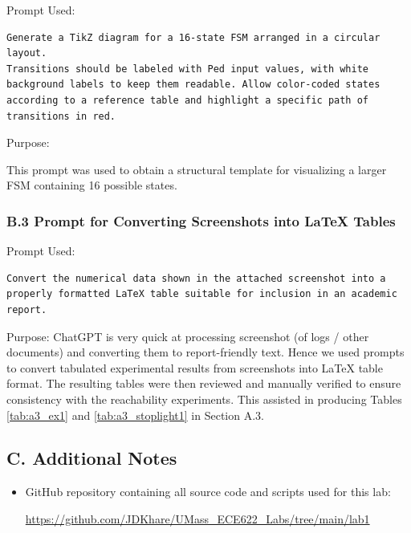 \documentclass[10pt]{article}
\begin{document}
Prompt Used:

\begin{verbatim}
Generate a TikZ diagram for a 16-state FSM arranged in a circular layout.
Transitions should be labeled with Ped input values, with white
background labels to keep them readable. Allow color-coded states
according to a reference table and highlight a specific path of
transitions in red.
\end{verbatim}

Purpose:

This prompt was used to obtain a structural template for visualizing a larger FSM containing 16 possible states.


\subsubsection*{B.3 Prompt for Converting Screenshots into LaTeX Tables}

Prompt Used:
\begin{verbatim}
Convert the numerical data shown in the attached screenshot into a
properly formatted LaTeX table suitable for inclusion in an academic report.
\end{verbatim}

Purpose:
ChatGPT is very quick at processing screenshot (of logs / other documents) and converting them to report-friendly text. Hence we used prompts to convert tabulated experimental results from screenshots into LaTeX table format. The resulting tables were then reviewed and manually verified to ensure consistency with the reachability experiments. This assisted in producing Tables \ref{tab:a3_ex1} and \ref{tab:a3_stoplight1} in Section A.3.

\subsection*{C. Additional Notes}

\begin{itemize}
\item GitHub repository containing all source code and scripts used for this lab:

\url{https://github.com/JDKhare/UMass_ECE622_Labs/tree/main/lab1}
\end{itemize}
\end{document}
